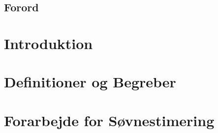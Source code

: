 %
%
%
%
% 



\pagestyle{empty} %
%
%

\newpage

\cleardoublepage

\section*{Forord}

\cleardoublepage

\renewcommand{\contentsname}{Indholdsfortegnelse}
\pagestyle{fancy} %
\setcounter{tocdepth}{1}
\tableofcontents
\listoftodos
%
\cleardoublepage

\chapter{Introduktion}


\chapter{Definitioner og Begreber}


\chapter{Forarbejde for Søvnestimering}\label{chap:forarbejdsoevn}

